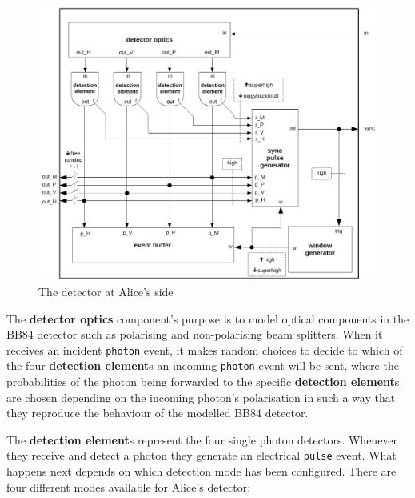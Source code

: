 \begin{figure}[h]
\centering
\includegraphics[scale=0.65]{drawings/detector_alice.pdf}
\caption{The detector at Alice's side}
\label{fig:outline_detector_alice}
\end{figure}

The \textbf{detector optics} component's purpose is to model optical components in the BB84 detector such as polarising and non-polarising beam splitters. When it receives an incident \texttt{photon} event, it makes random choices to decide to which of the four \textbf{detection element}s an incoming \texttt{photon} event will be sent, where the probabilities of the photon being forwarded to the specific \textbf{detection element}s are chosen depending on the incoming photon's polarisation in such a way that they reproduce the behaviour of the modelled BB84 detector.

The \textbf{detection element}s represent the four single photon detectors. Whenever they receive and detect a photon they generate an electrical \texttt{pulse} event. What happens next depends on which detection mode has been configured. There are four different modes available for Alice's detector:

